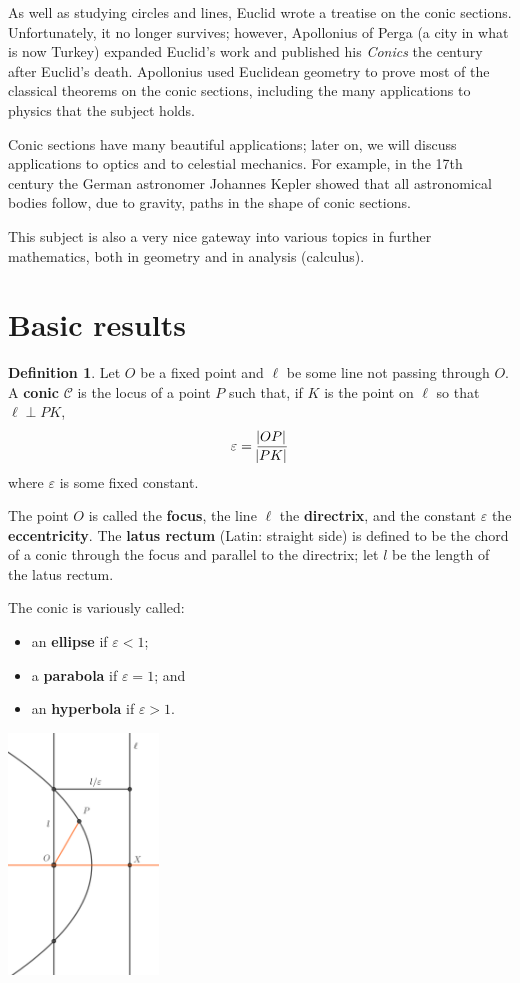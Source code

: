 \documentclass[a4paper,leqno,9pt]{article}
\theoremstyle{exercise}
\theoremstyle{plain}
\theoremstyle{definition}
\newtheorem*{defn}{Definition}
\newcommand{\df}[1]{\textbf{#1}}
\begin{document}
As well as studying circles and lines, Euclid wrote a treatise on the conic sections. Unfortunately, it no longer survives;
however, Apollonius of Perga (a city in what is now Turkey) expanded Euclid's work and published his \emph{Conics} the century
after Euclid's death. Apollonius used Euclidean geometry to prove most of the classical theorems on the conic sections, including
the many applications to physics that the subject holds.

Conic sections have many beautiful applications; later on, we will discuss applications to optics and to celestial mechanics. For
example, in the 17th century the German astronomer Johannes Kepler showed that all astronomical bodies follow, due to gravity,
paths in the shape of conic sections.

This subject is also a very nice gateway into various topics in further mathematics, both in geometry and in analysis (calculus).

\section{Basic results}
\begin{defn}
  Let $ O $ be a fixed point and $ \ell $ be some line not passing through $ O $. A \df{conic} $ \mathcal{C} $ is the locus of a point $ P $ such
  that, if $ K $ is the point on $ \ell $ so that $ \ell \perp PK $,
  \begin{displaymath}
    \varepsilon = \frac{\abs{OP}}{\abs{PK}}
  \end{displaymath}
  where $ \varepsilon $ is some fixed constant.

  The point $ O $ is called the \df{focus}, the line $ \ell $ the \df{directrix}, and the constant $\varepsilon$ the \df{eccentricity}.
  The \df{latus rectum} (Latin: straight side) is defined to be the chord of a conic through the focus and parallel to the
  directrix; let $ l $ be the length of the latus rectum.

  The conic is variously called:
  \begin{itemize}
    \item an \df{ellipse} if $ \varepsilon < 1 $;
    \item a \df{parabola} if $ \varepsilon = 1 $; and
    \item an \df{hyperbola} if $ \varepsilon > 1 $.
  \end{itemize}

  \begin{center}
    \includegraphics[width=0.3\textwidth]{polar}
  \end{center}
\end{defn}
\end{document}
